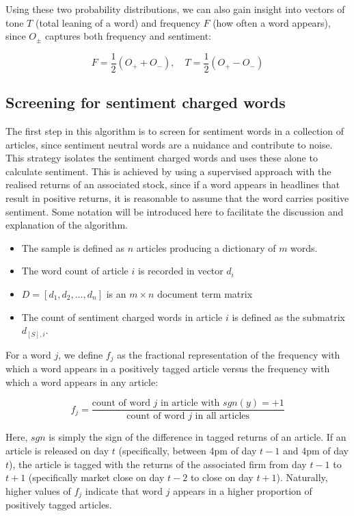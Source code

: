 Using these two probability distributions, we can also gain insight into vectors of tone $T$ (total leaning of a word) and frequency $F$ (how often a word appears), since $O_\pm$ captures both frequency and sentiment:

\begin{equation}
F = \frac{1}{2}(O_+ + O_-), \quad T= \frac{1}{2}(O_+ - O_-)
\end{equation}

\subsection{Screening for sentiment charged words}
\label{screen-sentiment}
The first step in this algorithm is to screen for sentiment words in a collection of articles, since sentiment neutral words are a nuidance and contribute to noise. This strategy isolates the sentiment charged words and uses these alone to calculate sentiment. This is achieved by using a supervised approach with the realised returns of an associated stock, since if a word appears in headlines that result in positive returns, it is reasonable to assume that the word carries positive sentiment. Some notation will be introduced here to facilitate the discussion and explanation of the algorithm.
\begin{itemize}
      \item The sample is defined as $n$ articles producing a dictionary of $m$ words.
      \item The word count of article $i$ is recorded in vector $d_i$
      \item $D = [d_1, d_2, \dots, d_n]$ is an $m \times n$ document term matrix
      \item The count of sentiment charged words in article $i$ is defined as the submatrix $d_{[S],i}$.
\end{itemize}

For a word $j$, we define $f_j$ as the fractional representation of the frequency with which a word appears in a positively tagged article versus the frequency with which a word appears in any article:

\begin{equation}
f_j = \frac{\text{count of word } j \text{ in article with } sgn(y) = +1}{\text{count of word } j \text{ in all articles}}
\end{equation}

\noindent
Here, $sgn$ is simply the sign of the difference in tagged returns of an article. If an article is released on day $t$ (specifically, between 4pm of day $t-1$ and 4pm of day $t$), the article is tagged with the returns of the associated firm from day $t-1$ to $t+1$ (specifically market close on day $t-2$ to close on day $t+1$). Naturally, higher values of $f_j$ indicate that word $j$ appears in a higher proportion of positively tagged articles.

